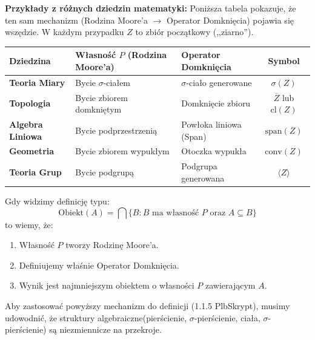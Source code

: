 \begin{contextline}
\vspace{1em}
\noindent\textbf{Przykłady z różnych dziedzin matematyki:}
Poniższa tabela pokazuje, że ten sam mechanizm (Rodzina Moore'a $\to$ Operator Domknięcia) pojawia się wszędzie. W każdym przypadku $Z$ to zbiór początkowy (,,ziarno'').

\begin{table}[H]
    \centering
    \renewcommand{\arraystretch}{1.3}
    \begin{tabularx}{\textwidth}{l l X c}
        \toprule
        \textbf{Dziedzina} & \textbf{Własność $P$ (Rodzina Moore'a)} & \textbf{Operator Domknięcia} & \textbf{Symbol} \\
        \midrule
        \textbf{Teoria Miary} & Bycie $\sigma$-ciałem & $\sigma$-ciało generowane & $\sigma(Z)$ \\
        \addlinespace
        \textbf{Topologia} & Bycie zbiorem domkniętym & Domknięcie zbioru & $\overline{Z}$ lub $\text{cl}(Z)$ \\
        \addlinespace
        \textbf{Algebra Liniowa} & Bycie podprzestrzenią & Powłoka liniowa (Span) & $\text{span}(Z)$ \\
        \addlinespace
        \textbf{Geometria} & Bycie zbiorem wypukłym & Otoczka wypukła & $\text{conv}(Z)$ \\
        \addlinespace
        \textbf{Teoria Grup} & Bycie podgrupą & Podgrupa generowana & $\langle Z \rangle$ \\
        \bottomrule
    \end{tabularx}
\end{table}

\begin{summary}
    Gdy widzimy definicję typu:
    \[ \text{Obiekt}(A) = \bigcap \{ B : B \text{ ma własność } P \text{ oraz } A \subseteq B \} \]
    to wiemy, że:
    \begin{enumerate}
        \item Własność $P$ tworzy Rodzinę Moore'a.
        \item Definiujemy właśnie Operator Domknięcia.
        \item Wynik jest najmniejszym obiektem o własności $P$ zawierającym $A$.
    \end{enumerate}
\end{summary}
\end{contextline}
\vspace{1em}
Aby zastosować powyższy mechanizm do definicji (1.1.5 PlbSkrypt), musimy udowodnić, że struktury algebraiczne(pierścienie, $\sigma$-pierścienie, ciała, $\sigma$-pierścienie) są niezmiennicze na przekroje.

